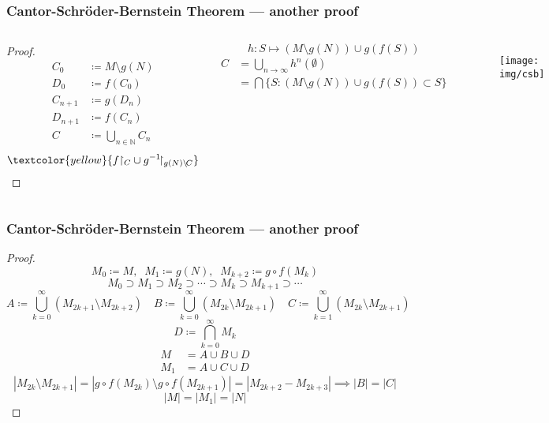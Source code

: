 \documentclass[UTF8,aspectratio=43,11pt,colorlinks,compress,openany]{beamer}%
\begin{document}
\begin{frame}\frametitle{Cantor-Schr\"oder-Bernstein Theorem --- another proof}
\setlength\abovedisplayskip{0pt}
\setlength\belowdisplayskip{0pt}
	\vspace{-2ex}
	\begin{columns}
			\begin{proof}
				\begin{align*}
				C_0&\coloneqq M\setminus g(N)\\
				D_0&\coloneqq f(C_0)\\
				C_{n+1}&\coloneqq g(D_n)\\
				D_{n+1}&\coloneqq f(C_n)\\
				C&\coloneqq \bigcup\limits_{n\in\mathbb{N}}C_n
				\end{align*}
				\[\textcolor{yellow}{f{\restriction_C}\cup g^{-1}\!{\restriction_{g(N)\setminus\!C}}}\]
			\end{proof}\vspace{-2ex}
			\[h: S\mapsto (M\setminus g(N))\cup g(f(S))\]
			\begin{align*}
			C&=\bigcup\limits_{n\to\infty}h^n(\emptyset)\\
			&=\bigcap\Big\{S: (M\setminus g(N))\cup g(f(S))\subset S\Big\}
			\end{align*}
		\begin{figure}
			\texttt{[image: img/csb]}
		\end{figure}
	\end{columns}
\end{frame}

\begin{frame}\frametitle{Cantor-Schr\"oder-Bernstein Theorem --- another proof}\vspace{-1ex}
	\begin{proof}
		\[M_0\coloneqq M,\;\;M_1\coloneqq g(N),\;\;M_{k+2}\coloneqq g\circ f(M_k)\]
		\[M_0\supset M_1\supset M_2\supset\cdots\supset M_k\supset M_{k+1}\supset\cdots\]
	\setlength\abovedisplayskip{0pt}
	\setlength\belowdisplayskip{0pt}
		\[
		A\coloneqq \bigcup\limits_{k=0}^\infty (M_{2k+1}\setminus M_{2k+2})\quad
		B\coloneqq \bigcup\limits_{k=0}^\infty (M_{2k}\setminus M_{2k+1})\quad
		C\coloneqq \bigcup\limits_{k=1}^\infty (M_{2k}\setminus M_{2k+1})\]
		\[D\coloneqq \bigcap\limits_{k=0}^\infty M_k\]
		\begin{align*}
		M&=A\cup B\cup D\\
		M_1&=A\cup C\cup D
		\end{align*}
		\[|M_{2k}\setminus M_{2k+1}|=|g\circ f(M_{2k})\setminus g\circ f(M_{2k+1})|=|M_{2k+2}-M_{2k+3}|\implies |B|=|C|\]
		\[|M|=|M_1|=|N|\]
	\end{proof}
\end{frame}
\end{document}
